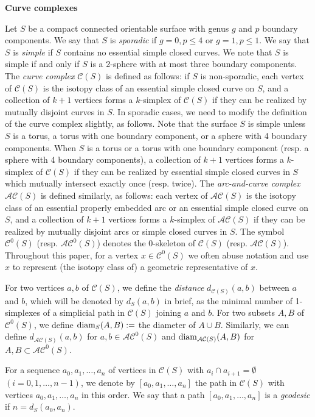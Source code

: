 \documentclass[]{aspm}
\begin{document}
\medskip
\noindent
{\bf Curve complexes}

Let $S$ be a compact connected orientable surface with genus $g$ and $p$ boundary components.  
We say that $S$ is {\it sporadic} if $g=0, p\leq 4$ or $g=1, p\leq1$. 
We say that $S$ is {\it simple} if $S$ contains no essential simple closed curves. 
We note that $S$ is simple if and only if $S$ is a 2-sphere with at most three boundary components. 
The {\it curve complex} $\mathcal{C}(S)$ is defined as follows: if $S$ is non-sporadic, each vertex of $\mathcal{C}(S)$ is the isotopy class of an essential simple closed curve on $S$, and a collection of $k+1$ vertices forms a $k$-simplex of $\mathcal{C}(S)$ if they can be realized by mutually disjoint curves in $S$. 
In sporadic cases, we need to modify the definition of the curve complex slightly, as follows. 
Note that the surface $S$ is simple unless $S$ is a torus, a torus with one boundary component, or a sphere with 4 boundary components.
When $S$ is a torus or a torus with one boundary component (resp. a sphere with 4 boundary components), a collection of $k+1$ vertices forms a $k$-simplex of $\mathcal{C}(S)$ if they can be realized by essential simple closed curves in $S$ which mutually intersect exactly once (resp. twice). 
The {\it arc-and-curve complex} $\mathcal{AC}(S)$ is defined similarly, as follows: each vertex of $\mathcal{AC}(S)$ is the isotopy class of an essential properly embedded arc or an essential simple closed curve on $S$, and a collection of $k+1$ vertices forms a $k$-simplex of $\mathcal{AC}(S)$ if they can be realized by mutually disjoint arcs or simple closed curves in $S$. 
The symbol $\mathcal{C}^0(S)$ (resp. $\mathcal{AC}^0(S)$) denotes the 0-skeleton of $\mathcal{C}(S)$ (resp. $\mathcal{AC}(S)$).
Throughout this paper, for a vertex $x\in\mathcal{C}^0(S)$ we often abuse notation and use $x$ to represent (the isotopy class of) a geometric representative of $x$. 

For two vertices $a, b$ of $\mathcal{C}(S)$, we define the {\it distance} $d_{\mathcal{C}(S)}(a, b)$ between $a$ and $b$, which will be denoted by $d_{S}(a, b)$ in brief, as the minimal number of 1-simplexes of a simplicial path in $\mathcal{C}(S)$ joining $a$ and $b$. 
For two subsets $A, B$ of $\mathcal{C}^0(S)$, 
we define ${\rm diam}_{S}(A, B):=$ the diameter of $A\cup B$. 
Similarly, we can define $d_{\mathcal{AC}(S)}(a, b)$ for $a,b\in\mathcal{AC}^0(S)$ and ${\rm diam}_{\mathcal{AC}(S)}(A, B)$ for $A,B\subset\mathcal{AC}^0(S)$.

For a sequence $a_0,a_1,\dots,a_n$ of vertices in $\mathcal{C}(S)$ with $a_i\cap a_{i+1}
=\emptyset$ $(i=0,1,\dots,n-1)$, we denote by $[a_0,a_1,\dots,a_n]$ the path in $\mathcal{C}(S)$ with vertices $a_0,a_1,\dots,a_n$ in this order.
We say that a path $[a_0,a_1,\dots,a_n]$ is a {\it geodesic} if $n=d_S(a_0,a_n)$.
\end{document}
